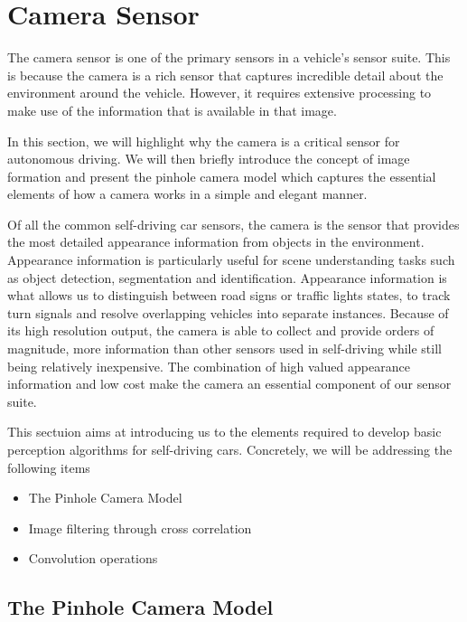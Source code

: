 \section{Camera Sensor}
\label{camera_sensor}

The camera sensor is one of the primary sensors in a vehicle's sensor suite.
This is because the camera is a rich sensor that captures incredible detail
about the environment around the vehicle. However, it requires
extensive processing to make use of the information that is
available in that image. 

In this section, we will highlight why the camera is a critical sensor
for autonomous driving. We will then briefly introduce the concept of
image formation and present the pinhole camera model
which captures the essential elements of how a camera works in a simple
and elegant manner.

Of all the common self-driving car sensors, the camera is the sensor
that provides the most detailed appearance information from objects in the environment. Appearance information
is particularly useful for scene understanding tasks such as object detection, segmentation and identification. 
Appearance information is what allows us to distinguish between road signs or
traffic lights states, to track turn signals and resolve overlapping vehicles
into separate instances. Because of its high resolution output, the camera is able to collect and provide orders of magnitude, more information than
other sensors used in self-driving while still being relatively inexpensive. The combination of high valued
appearance information and low cost make the camera an essential component of our sensor suite. 

This sectuion aims at introducing us to the elements required to develop basic perception algorithms for self-driving cars.
Concretely, we will be addressing the following items

\begin{itemize}
\item The Pinhole Camera Model
\item Image filtering through cross correlation
\item Convolution operations
\end{itemize}


\subsection{The Pinhole Camera Model}
\label{pinhole_model}

